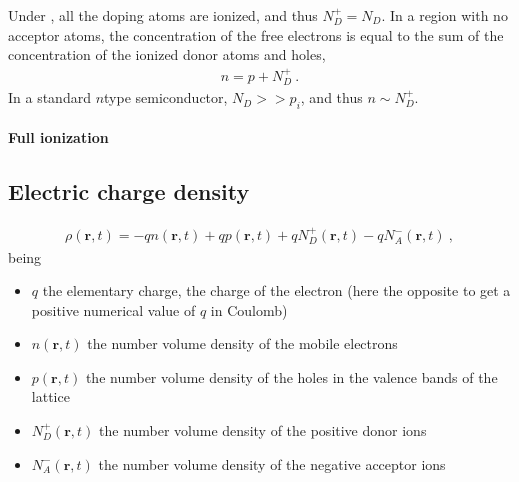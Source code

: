 \documentclass[letterpaper,10pt,english]{jupyterBook}
\begin{document}
\sphinxAtStartPar
Under {\hyperref[\detokenize{ch/solid-state/semiconductors-equilibrium:semiconductors-equilibrium-structure-doped-full-ionization}]{}}, all the doping atoms are ionized, and thus \(N_D^+ = N_D\). In a  region with no acceptor atoms, the concentration of the free electrons is equal to the sum of the concentration of the ionized donor atoms and holes,
\begin{equation*}
\begin{split}n = p + N_D^+ \ .\end{split}
\end{equation*}
\sphinxAtStartPar
In a standard \(n\)\sphinxhyphen{}type semiconductor, \(N_D >> p_i\), and thus \(n \sim N_D^+\).


\paragraph{Full ionization}
\label{\detokenize{ch/solid-state/semiconductors-equilibrium:full-ionization}}\label{\detokenize{ch/solid-state/semiconductors-equilibrium:semiconductors-equilibrium-structure-doped-full-ionization}}
\sphinxAtStartPar
{}


\subsection{Electric charge density}
\label{\detokenize{ch/solid-state/semiconductors-equilibrium:electric-charge-density}}\label{\detokenize{ch/solid-state/semiconductors-equilibrium:semiconductors-equilibrium-charge-density}}\begin{equation}\label{equation:ch/solid-state/semiconductors-equilibrium:eq:semi:charge-density}
\begin{split}\rho(\mathbf{r},t) = -q n(\mathbf{r},t) + q p(\mathbf{r},t) + q N_D^+(\mathbf{r},t) - q N_A^-(\mathbf{r},t) \ ,\end{split}
\end{equation}
\sphinxAtStartPar
being
\begin{itemize}
\item {} 
\sphinxAtStartPar
\(q\) the elementary charge, the charge of the electron (here the opposite to get a positive numerical value of \(q\) in Coulomb)

\item {} 
\sphinxAtStartPar
\(n(\mathbf{r},t)\) the number volume density of the mobile electrons

\item {} 
\sphinxAtStartPar
\(p(\mathbf{r},t)\) the number volume density of the holes in the valence bands of the lattice

\item {} 
\sphinxAtStartPar
\(N_D^+(\mathbf{r},t)\) the number volume density of the positive donor ions

\item {} 
\sphinxAtStartPar
\(N_A^-(\mathbf{r},t)\) the number volume density of the negative acceptor ions

\end{itemize}
\end{document}
